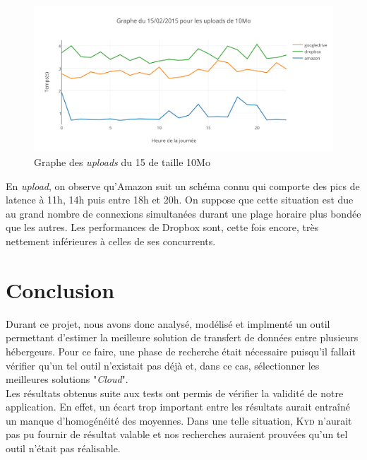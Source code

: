 \documentclass[10pt]{article}
\newcommand{\KYD}{\textsc{Kyd}\xspace}
\begin{document}
\newpage

\begin{figure}[h] \centering
\includegraphics[scale=0.7]{graphe_du_15022015_pour_les_uploads_de_10mo.png}
\caption{Graphe des \textit{uploads} du 15 de taille 10Mo} \end{figure}

En \textit{upload}, on observe qu'Amazon suit un schéma connu qui comporte des
pics de latence à 11h, 14h puis entre 18h et 20h. On suppose que cette situation
est due au grand nombre de connexions simultanées durant une plage horaire plus
bondée que les autres. Les performances de Dropbox sont, cette fois encore, très
nettement inférieures à celles de ses concurrents.




\section{Conclusion}

Durant ce projet, nous avons donc analysé, modélisé et implmenté un outil permettant d'estimer la
meilleure solution de transfert de données entre plusieurs hébergeurs. Pour ce
faire, une phase de recherche était nécessaire puisqu'il fallait vérifier qu'un
tel outil n'existait pas déjà et, dans ce cas, sélectionner les meilleures
solutions "\textit{Cloud}".\\

Les résultats obtenus suite aux tests ont permis de vérifier la validité de
notre application. En effet, un écart trop important entre les résultats aurait
entraîné un manque d'homogénéité des moyennes. Dans une telle situation, \KYD
n'aurait pas pu fournir de résultat valable et nos recherches auraient prouvées
qu'un tel outil n'était pas réalisable.\\
\end{document}
